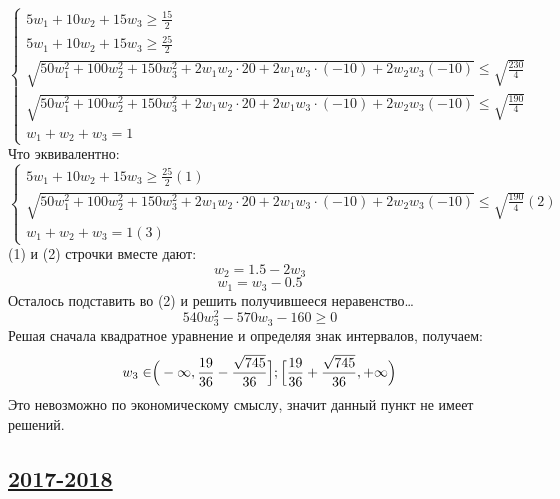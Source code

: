 \begin{enumerate}
\begin{enumerate}
	\begin{equation*}
	\begin{cases}
	5w_{1} + 10w_{2} + 15w_{3} \ge \frac{15}{2}\\
	5w_{1} + 10w_{2} + 15w_{3} \ge \frac{25}{2}\\
	\sqrt{50w_{1}^{2} + 100w_{2}^{2} + 150w_{3}^{2} +2w_{1}w_{2}\cdot20 + 2w_{1}w_{3}\cdot(-10) + 2w_{2}w_{3}(-10)} \le \sqrt{\frac{230}{4}}\\
	\sqrt{50w_{1}^{2} + 100w_{2}^{2} + 150w_{3}^{2} +2w_{1}w_{2}\cdot20 + 2w_{1}w_{3}\cdot(-10) + 2w_{2}w_{3}(-10)} \le \sqrt{\frac{190}{4}}\\
	w_{1} + w_{2} + w_{3} = 1
	\end{cases}
	\end{equation*}
	Что эквивалентно:
	\begin{equation*}
	\begin{cases}
	5w_{1} + 10w_{2} + 15w_{3} \ge \frac{25}{2} (1)\\
	\sqrt{50w_{1}^{2} + 100w_{2}^{2} + 150w_{3}^{2} +2w_{1}w_{2}\cdot20 + 2w_{1}w_{3}\cdot(-10) + 2w_{2}w_{3}(-10)} \le \sqrt{\frac{190}{4}} (2)\\
	w_{1} + w_{2} + w_{3} = 1 (3)
	\end{cases}
	\end{equation*}
	(1) и (2) строчки вместе дают:
	\[w_{2} = 1.5 - 2w_{3}\]
	\[w_{1} = w_{3} - 0.5\]
	Осталось подставить во (2) и решить получившееся неравенство\ldots
	\[540w_{3}^{2} - 570w_{3} - 160 \ge 0\]
	Решая сначала квадратное уравнение и определяя знак интервалов, получаем:
	\[w_{3} \in \Bigr(-\infty, \frac{19}{36} - \frac{\sqrt{745}}{36}\Bigl]; \Bigl[\frac{19}{36} + \frac{\sqrt{745}}{36}, +\infty\Bigl)\]
	Это невозможно по экономическому смыслу, значит данный пункт не имеет решений.
\end{enumerate}



\end{enumerate}

\subsection[2017-2018]{\hyperref[sec:kr_02_2017_2018]{2017-2018}}
\label{sec:sol_kr_02_2017_2018}


